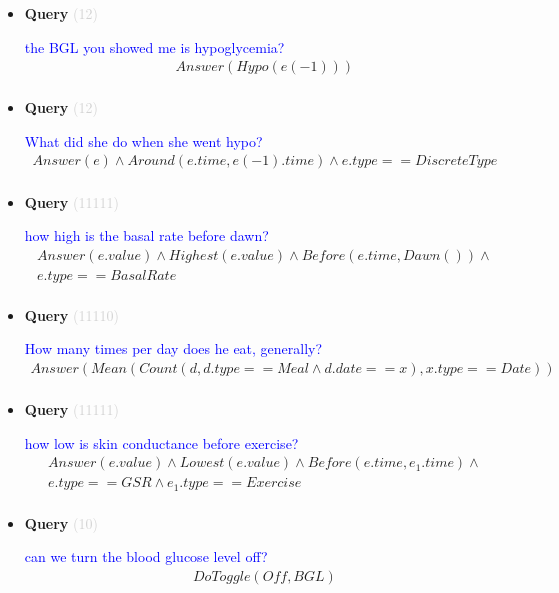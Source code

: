 \documentclass[11pt]{article}
\newcommand{\key}[1]{\textcolor{lightgray}{#1}}
\newcounter{CQuery}
\begin{document}
\begin{itemize}
\item
\textbf{Query\theCQuery} \key{(12)} \addtocounter{CQuery}{1}
\textcolor{blue}{ the BGL you showed me is hypoglycemia? }
\begin{multline*}
Answer(Hypo(e(-1))) \\ 
\end{multline*}


\item
\textbf{Query\theCQuery} \key{(12)} \addtocounter{CQuery}{1}
\textcolor{blue}{ What did she do when she went hypo? }
\begin{multline*}
Answer(e) \wedge Around(e.time, e(-1).time) \wedge e.type==DiscreteType \\ 
\end{multline*}


\item
\textbf{Query\theCQuery} \key{(11111)} \addtocounter{CQuery}{1}
\textcolor{blue}{ how high is the basal rate before dawn? }
\begin{multline*}
Answer(e.value) \wedge Highest(e.value) \wedge Before(e.time, Dawn()) \wedge \\ 
e.type==BasalRate \\ 
\end{multline*}


\item
\textbf{Query\theCQuery} \key{(11110)} \addtocounter{CQuery}{1}
\textcolor{blue}{ How many times per day does he eat, generally? }
\begin{multline*}
Answer(Mean(Count(d, d.type==Meal \wedge d.date==x), x.type==Date)) \\ 
\end{multline*}


\item
\textbf{Query\theCQuery} \key{(11111)} \addtocounter{CQuery}{1}
\textcolor{blue}{ how low is skin conductance before exercise? }
\begin{multline*}
Answer(e.value) \wedge Lowest(e.value) \wedge Before(e.time, e_1.time) \wedge \\ 
e.type==GSR \wedge e_1.type==Exercise \\ 
\end{multline*}


\item
\textbf{Query\theCQuery} \key{(10)} \addtocounter{CQuery}{1}
\textcolor{blue}{ can we turn the blood glucose level off? }
\begin{multline*}
DoToggle(Off, BGL) \\ 
\end{multline*}



\end{itemize}
\end{document}

